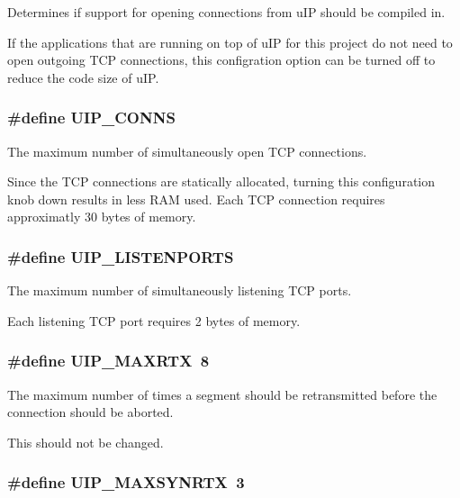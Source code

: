 Determines if support for opening connections from u\-IP should be compiled in. 

If the applications that are running on top of u\-IP for this project do not need to open outgoing TCP connections, this configration option can be turned off to reduce the code size of u\-IP. \hypertarget{a00074_gf5fe83be78b78b9e7d9e7f1e34ab1cc5}{
\subsubsection[UIP\_\-CONNS]{\setlength{\rightskip}{0pt plus 5cm}\#define UIP\_\-CONNS}}
\label{a00074_gf5fe83be78b78b9e7d9e7f1e34ab1cc5}


The maximum number of simultaneously open TCP connections. 

Since the TCP connections are statically allocated, turning this configuration knob down results in less RAM used. Each TCP connection requires approximatly 30 bytes of memory. \hypertarget{a00074_g8f4ebd8ef6c0ea665ed351d87fec09fd}{
\subsubsection[UIP\_\-LISTENPORTS]{\setlength{\rightskip}{0pt plus 5cm}\#define UIP\_\-LISTENPORTS}}
\label{a00074_g8f4ebd8ef6c0ea665ed351d87fec09fd}


The maximum number of simultaneously listening TCP ports. 

Each listening TCP port requires 2 bytes of memory. \hypertarget{a00074_g67cf1e0d2324c93f332c1f020c0fe8b3}{
\subsubsection[UIP\_\-MAXRTX]{\setlength{\rightskip}{0pt plus 5cm}\#define UIP\_\-MAXRTX~8}}
\label{a00074_g67cf1e0d2324c93f332c1f020c0fe8b3}


The maximum number of times a segment should be retransmitted before the connection should be aborted. 

This should not be changed. \hypertarget{a00074_g24aa5bc36939cc9a0833e1df01478a7e}{
\subsubsection[UIP\_\-MAXSYNRTX]{\setlength{\rightskip}{0pt plus 5cm}\#define UIP\_\-MAXSYNRTX~3}}
\label{a00074_g24aa5bc36939cc9a0833e1df01478a7e}


